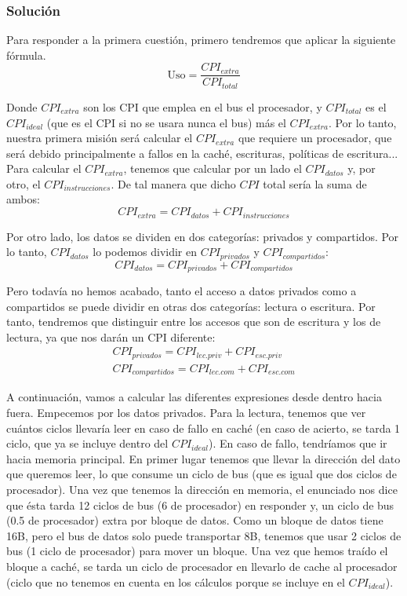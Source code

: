 \documentclass[12pt,a4paper]{article}
\begin{document}
\subsubsection{Solución}
Para responder a la primera cuestión, primero tendremos que aplicar la siguiente fórmula.
\begin{equation}
\text{Uso}=\frac{CPI_{extra}}{CPI_{total}}
\end{equation}

Donde $CPI_{extra}$ son los CPI que emplea en el bus el procesador, y $CPI_{total}$ es el $CPI_{ideal}$ (que es el CPI si no se usara nunca el bus) más el $CPI_{extra}$. Por lo tanto, nuestra primera misión será calcular el $CPI_{extra}$ que requiere un procesador, que será debido principalmente a fallos en la caché, escrituras, políticas de escritura...\\

Para calcular el $CPI_{extra}$, tenemos que calcular por un lado el $CPI_{datos}$ y, por otro, el $CPI_{instrucciones}$. De tal manera que dicho $CPI$ total sería la suma de ambos:
\begin{equation}
CPI_{extra}=CPI_{datos}+CPI_{instrucciones}
\end{equation}

Por otro lado, los datos se dividen en dos categorías: privados y compartidos. Por lo tanto, $CPI_{datos}$ lo podemos dividir en $CPI_{privados}$ y $CPI_{compartidos}$:
\begin{equation}
CPI_{datos}=CPI_{privados}+CPI_{compartidos}
\end{equation}

Pero todavía no hemos acabado, tanto el acceso a datos privados como a compartidos se puede dividir en otras dos categorías: lectura o escritura. Por tanto, tendremos que distinguir entre los accesos que son de escritura y los de lectura, ya que nos darán un CPI diferente:
\begin{align}
CPI_{privados}=CPI_{lec.priv}+CPI_{esc.priv}\\
CPI_{compartidos}=CPI_{lec.com}+CPI_{esc.com}
\end{align}

A continuación, vamos a calcular las diferentes expresiones desde dentro hacia fuera. Empecemos por los datos privados. Para la lectura, tenemos que ver cuántos ciclos llevaría leer en caso de fallo en caché (en caso de acierto, se tarda 1 ciclo, que ya se incluye dentro del $CPI_{ideal}$). En caso de fallo, tendríamos que ir hacia memoria principal. En primer lugar tenemos que llevar la dirección del dato que queremos leer, lo que consume un ciclo de bus (que es igual que dos ciclos de procesador). Una vez que tenemos la dirección en memoria, el enunciado nos dice que ésta tarda 12 ciclos de bus (6 de procesador) en responder y, un ciclo de bus (0.5 de procesador) extra por bloque de datos. Como un bloque de datos tiene 16B, pero el bus de datos solo puede transportar 8B, tenemos que usar 2 ciclos de bus (1 ciclo de procesador) para mover un bloque. Una vez que hemos traído el bloque a caché, se tarda un ciclo de procesador en llevarlo de cache al procesador (ciclo que no tenemos en cuenta en los cálculos porque se incluye en el $CPI_{ideal}$). \\
\end{document}
